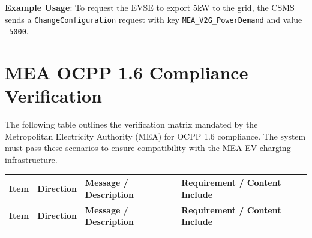 \documentclass[a4paper,11pt]{report}
\begin{document}
\textbf{Example Usage}: To request the EVSE to export 5kW to the grid, the CSMS sends a \texttt{ChangeConfiguration} request with key \texttt{MEA\_V2G\_PowerDemand} and value \texttt{-5000}.

\section{MEA OCPP 1.6 Compliance Verification}
\label{sec:matrix}
The following table outlines the verification matrix mandated by the Metropolitan Electricity Authority (MEA) for OCPP 1.6 compliance. The system must pass these scenarios to ensure compatibility with the MEA EV charging infrastructure.

\begin{footnotesize}
\begin{longtable}{|p{1.2cm}|p{2.5cm}|p{5.5cm}|p{6cm}|}
\hline
\textbf{Item} & \textbf{Direction} & \textbf{Message / Description} & \textbf{Requirement / Content Include} \\
\hline
\endfirsthead
\hline
\textbf{Item} & \textbf{Direction} & \textbf{Message / Description} & \textbf{Requirement / Content Include} \\
\hline
\endhead
\hline
\endfoot


\end{longtable}
\end{footnotesize}
\end{document}
